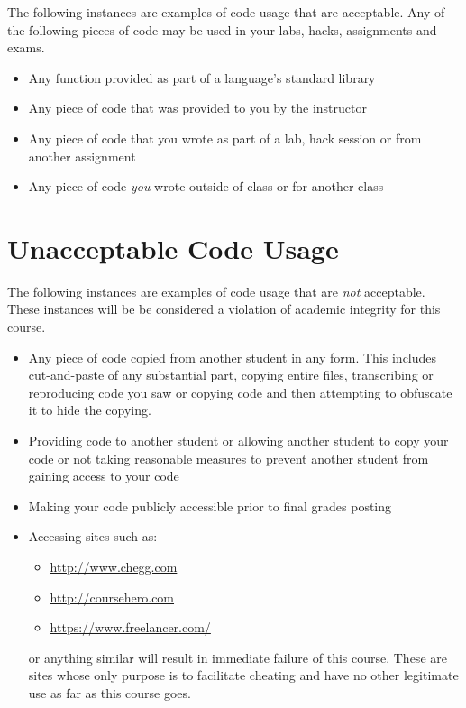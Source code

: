 \documentclass[12pt]{scrartcl}
\begin{document}
The following instances are examples of code usage that are acceptable.
Any of the following pieces of code may be used in your labs, hacks, assignments
and exams.

\begin{itemize}
  \item Any function provided as part of a language's standard library
  \item Any piece of code that was provided to you by the instructor
  \item Any piece of code that you wrote as part of a lab, hack session or from another assignment
  \item Any piece of code \emph{you} wrote outside of class or for another class
\end{itemize}

\section*{Unacceptable Code Usage}

The following instances are examples of code usage that are \emph{not}
acceptable.  These instances will be be considered a violation of academic 
integrity for this course.

\begin{itemize}
  \item Any piece of code copied from another student in any form.  This
  includes cut-and-paste of any substantial part, copying entire files, 
  transcribing or reproducing code you saw or copying code and then attempting
  to obfuscate it to hide the copying.
  \item Providing code to another student or allowing another student to copy your code or not taking reasonable measures to prevent another student from gaining access to your code
  \item Making your code publicly accessible prior to final grades posting
  \item Accessing sites such as:
  \begin{itemize}
    \item \url{http://www.chegg.com}
    \item \url{http://coursehero.com}
    \item \url{https://www.freelancer.com/} 
  \end{itemize}
  or anything similar will result in immediate failure of this course.  These
  are sites whose only purpose is to facilitate cheating and have no other 
  legitimate use as far as this course goes.
\end{itemize}
\end{document}
